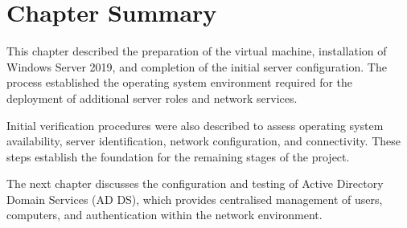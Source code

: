 \section{Chapter Summary}

This chapter described the preparation of the virtual machine, installation of Windows Server 2019, and completion of the initial server configuration. The process established the operating system environment required for the deployment of additional server roles and network services.

Initial verification procedures were also described to assess operating system availability, server identification, network configuration, and connectivity. These steps establish the foundation for the remaining stages of the project.

The next chapter discusses the configuration and testing of Active Directory Domain Services (AD DS), which provides centralised management of users, computers, and authentication within the network environment.